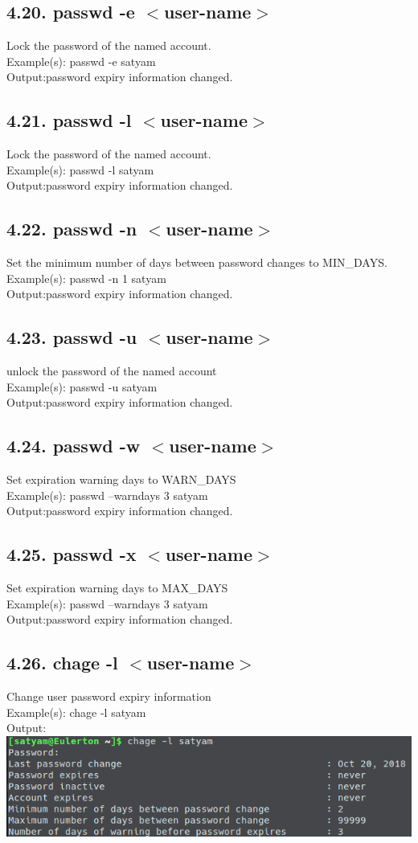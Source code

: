 \documentclass[11pt,a4]{article}
\begin{document}
\begin{enumerate}
\subsection*{4.20. passwd -e $<$user-name$>$}
 Lock the password of the named account.\\
Example(s): passwd -e satyam\\
Output:password expiry information changed.
\subsection*{4.21. passwd -l $<$user-name$>$}
 Lock the password of the named account.\\
Example(s): passwd -l satyam\\
Output:password expiry information changed.
\subsection*{4.22. passwd -n $<$user-name$>$}
Set the minimum number of days between password changes to MIN\_DAYS.\\
Example(s): passwd -n 1  satyam\\
Output:password expiry information changed.
\subsection*{4.23. passwd -u $<$user-name$>$}
unlock the password of the named account\\
Example(s): passwd -u satyam\\
Output:password expiry information changed.
\subsection*{4.24. passwd -w $<$user-name$>$}
Set expiration warning days to WARN\_DAYS\\
Example(s): passwd --warndays 3 satyam\\
Output:password expiry information changed.
\subsection*{4.25. passwd -x $<$user-name$>$}
Set expiration warning days to MAX\_DAYS\\
Example(s): passwd --warndays 3 satyam\\
Output:password expiry information changed.
\subsection*{4.26. chage -l $<$user-name$>$}
Change user password expiry information\\
Example(s): chage -l satyam\\
Output:\\\includegraphics[width=\textwidth]{Q4_26.png}

\end{enumerate}
\end{document}
